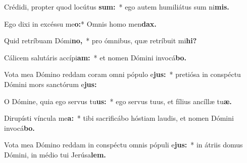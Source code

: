 \item Crédidi, pro\-pter quod locútus \textbf{sum:}~* ego autem humiliátus sum ni\textbf{mis.}
\item Ego dixi in excéssu me\textbf{o:}* Omnis homo men\textbf{dax.}
\item Quid retríbuam Dómi\textbf{no,}~* pro ó\-mnibus, quæ retríbuit mi\textbf{hi?}
\item Cálicem salutáris accípi\textbf{am:}~* et nomen Dómini invocá\textbf{bo.}
\item Vota mea Dómino reddam coram omni pópulo e\textbf{jus:}~* pretiósa in conspé\-ctu Dómini mors san\-ctórum e\textbf{jus:}
\item O Dómine, quia ego servus tu\textbf{us:}~* ego servus tuus, et fílius ancíllæ tu\textbf{æ.}
\item Dirupísti víncula me\textbf{a:}~* tibi sacrificábo hóstiam laudis, et nomen Dómini invocá\textbf{bo.}
\item Vota mea Dómino reddam in conspéctu omnis pópuli e\textbf{jus:}~* in átriis domus Dómini, in médio tui Jerúsa\textbf{lem.}